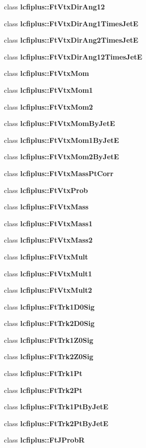 \begin{DoxyCompactItemize}
\item 
class \textbf{ lcfiplus\+::\+Ft\+Vtx\+Dir\+Ang12}
\item 
class \textbf{ lcfiplus\+::\+Ft\+Vtx\+Dir\+Ang1\+Times\+JetE}
\item 
class \textbf{ lcfiplus\+::\+Ft\+Vtx\+Dir\+Ang2\+Times\+JetE}
\item 
class \textbf{ lcfiplus\+::\+Ft\+Vtx\+Dir\+Ang12\+Times\+JetE}
\item 
class \textbf{ lcfiplus\+::\+Ft\+Vtx\+Mom}
\item 
class \textbf{ lcfiplus\+::\+Ft\+Vtx\+Mom1}
\item 
class \textbf{ lcfiplus\+::\+Ft\+Vtx\+Mom2}
\item 
class \textbf{ lcfiplus\+::\+Ft\+Vtx\+Mom\+By\+JetE}
\item 
class \textbf{ lcfiplus\+::\+Ft\+Vtx\+Mom1\+By\+JetE}
\item 
class \textbf{ lcfiplus\+::\+Ft\+Vtx\+Mom2\+By\+JetE}
\item 
class \textbf{ lcfiplus\+::\+Ft\+Vtx\+Mass\+Pt\+Corr}
\item 
class \textbf{ lcfiplus\+::\+Ft\+Vtx\+Prob}
\item 
class \textbf{ lcfiplus\+::\+Ft\+Vtx\+Mass}
\item 
class \textbf{ lcfiplus\+::\+Ft\+Vtx\+Mass1}
\item 
class \textbf{ lcfiplus\+::\+Ft\+Vtx\+Mass2}
\item 
class \textbf{ lcfiplus\+::\+Ft\+Vtx\+Mult}
\item 
class \textbf{ lcfiplus\+::\+Ft\+Vtx\+Mult1}
\item 
class \textbf{ lcfiplus\+::\+Ft\+Vtx\+Mult2}
\item 
class \textbf{ lcfiplus\+::\+Ft\+Trk1\+D0\+Sig}
\item 
class \textbf{ lcfiplus\+::\+Ft\+Trk2\+D0\+Sig}
\item 
class \textbf{ lcfiplus\+::\+Ft\+Trk1\+Z0\+Sig}
\item 
class \textbf{ lcfiplus\+::\+Ft\+Trk2\+Z0\+Sig}
\item 
class \textbf{ lcfiplus\+::\+Ft\+Trk1\+Pt}
\item 
class \textbf{ lcfiplus\+::\+Ft\+Trk2\+Pt}
\item 
class \textbf{ lcfiplus\+::\+Ft\+Trk1\+Pt\+By\+JetE}
\item 
class \textbf{ lcfiplus\+::\+Ft\+Trk2\+Pt\+By\+JetE}
\item 
class \textbf{ lcfiplus\+::\+Ft\+J\+ProbR}
\item 

\end{DoxyCompactItemize}
